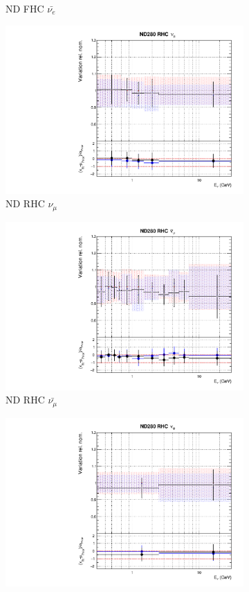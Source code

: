 \begin{figure}[t]
\begin{subfigure}{0.42\textwidth}
  \caption{ND FHC $\bar{\nu_{e}}$}
\end{subfigure}
\begin{subfigure}{0.42\textwidth}
  \centering
  \includegraphics[width=0.75\linewidth]{figs/rhcmpasmvflux4}
  \caption{ND RHC $\nu_{\mu}$}
\end{subfigure}
\begin{subfigure}{0.42\textwidth}
  \centering
  \includegraphics[width=0.75\linewidth]{figs/rhcmpasmvflux5}
  \caption{ND RHC $\bar{\nu_{\mu}}$}
\end{subfigure}
\begin{subfigure}{0.42\textwidth}
  \centering
  \includegraphics[width=0.75\linewidth]{figs/rhcmpasmvflux6}

\end{subfigure}
\end{figure}
